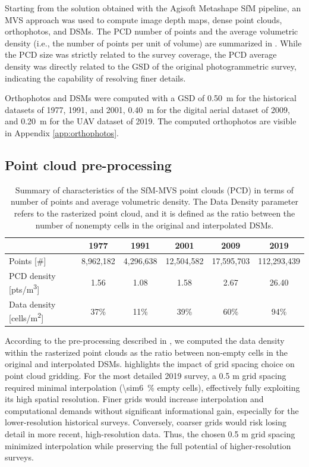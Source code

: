 Starting from the solution obtained with the Agisoft Metashape SfM pipeline, an MVS approach was used to compute image depth maps, dense point clouds, orthophotos, and DSMs. 
The PCD number of points and the average volumetric density (i.e., the number of points per unit of volume) are summarized in .
While the PCD size was strictly related to the survey coverage, the PCD average density was directly related to the GSD of the original photogrammetric survey, indicating the capability of resolving finer details.

Orthophotos and DSMs were computed with a GSD of \SI{0.50}{\meter} for the historical datasets of 1977, 1991, and 2001, \SI{0.40}{\meter} for the digital aerial dataset of 2009, and \SI{0.20}{\meter} for the UAV dataset of 2019.
The computed orthophotos are visible in Appendix \ref{app:orthophotos}.

\subsection{Point cloud pre-processing}\label{sec:2:res_preproc}

\begin{table}
    \centering
    \caption{Summary of characteristics of the SfM-MVS point clouds (PCD) in terms of number of points and average volumetric density. 
    The Data Density parameter refers to the rasterized point cloud, and it is defined as the ratio between the number of nonempty cells in the original and interpolated DSMs.}
    \label{tab:2:pcd_stats}
    \begin{tabular}{lccccc}
        \hline
        & 1977 & 1991 & 2001 & 2009 & 2019 \\
        \hline
        Points [\#] & 8,962,182 & 4,296,638 & 12,504,582 & 17,595,703 & 112,293,439 \\
        PCD density [pts/m\textsuperscript{3}] & 1.56 & 1.08 & 1.58 & 2.67 & 26.40 \\
        Data density [cells/m\textsuperscript{2}] & 37\% & 11\% & 39\% & 60\% & 94\% \\
        \hline
    \end{tabular}
\end{table}

According to the pre-processing described in , we computed the data density within the rasterized point clouds as the ratio between non-empty cells in the original and interpolated DSMs.
 highlights the impact of grid spacing choice on point cloud gridding. 
For the most detailed 2019 survey, a 0.5 m grid spacing required minimal interpolation (\SI{\sim6}{\percent} empty cells), effectively fully exploiting its high spatial resolution. 
Finer grids would increase interpolation and computational demands without significant informational gain, especially for the lower-resolution historical surveys. 
Conversely, coarser grids would risk losing detail in more recent, high-resolution data. Thus, the chosen 0.5 m grid spacing minimized interpolation while preserving the full potential of higher-resolution surveys.


